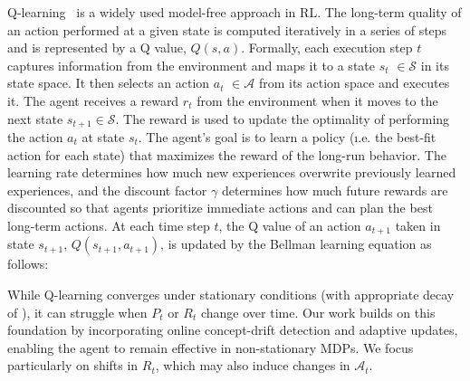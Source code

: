 Q-learning~\cite{watkins92} is a widely used model-free approach in \ac{RL}. The long-term quality of an action performed at a given state is computed iteratively in a series of steps and is represented by a Q value,
$\mathit{Q(s,a)}$.
Formally, each execution step $t$ captures information from the environment and maps it to a state
{\color{purple}$s_t$} $\in \mathcal{S}$ in its state space. It then selects an
action {\color{purple}$a_t$} $\in \mathcal{A}$ from its action space and executes it. The agent
receives a reward {\color{Bittersweet}$r_t$} from the environment when it moves to the next state
$s_{t+1} \in \mathcal{S}$. The reward is used to update the optimality of performing the
action {\color{Mulberry}$a_t$} at state {\color{purple}$s_t$}. The agent's goal is to learn
a policy (\i.e. the best-fit action for each state) that maximizes the reward of the
long-run behavior. The learning rate \lrate{\alpha} determines how much new experiences 
overwrite previously learned experiences, and the discount factor {\color{RoyalBlue} $\gamma$} 
determines how much future rewards are discounted so that agents prioritize immediate actions and 
can plan the best long-term actions. At each time step $t$, the Q value of an action 
{\color{purple}$a_{t+1}$} taken in state {\color{purple}$s_{t+1}$}, $Q(s_{t+1}, a_{t+1})$, is updated by 
the Bellman learning equation as follows:

\vspace{1em}


While Q-learning converges under stationary conditions (with appropriate decay of \lrate{\alpha}), it can struggle when $P_t$ or $R_t$ change over time. Our work builds on this foundation by incorporating online concept-drift detection and adaptive updates, enabling the agent to remain effective in non-stationary MDPs. We focus particularly on shifts in $R_t$, which may also induce changes in $\mathcal{A}_t$.


\endinput


